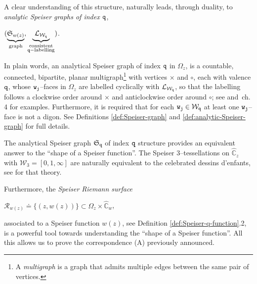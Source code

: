 \documentclass[final,3p,times]{elsarticle}
\newcommand{\CW}{\ensuremath{{\widehat{\mathbb C}}}}
\newcommand{\R}{\ensuremath{{\mathcal R}}}
\theoremstyle{definition}
\begin{document}
\noindent
A clear understanding of this structure, 
naturally leads, through duality, to
\emph{analytic Speiser graphs of index $\tt q$},

\centerline{
$(
\underbrace{\mathfrak{S}_{w(z)} }_{\text{graph}}, 
\underbrace{\  \mathcal{L}_{\mathcal{W}_{\tt q}} \ }_{
\substack{ \text{consistent}\\
{\tt q}-\text{labelling}}
} )$.}

\noindent
In plain words, 
an analytical Speiser graph of index ${\tt q}$
in $\Omega_z$, is a countable, connected, bipartite,
planar multigraph\footnote{
A \emph{multigraph} is a graph that admits multiple edges 
between the same pair of vertices.} 
with vertices $\times$ and $\circ$, each with valence $\tt q$, whose ${\tt w}_{\tt j}$--faces in $\Omega_z$ are
labelled cyclically with $\mathcal{L}_{\mathcal{W}_{\tt q}}$, 
so that the labelling follows a clockwise order around $\times$ and 
anticlockwise order around $\circ$; 
see 
\cite{Nevanlinna2} and 
\cite{GoldbergOstrovskii}\,ch.\,4
for examples.
Furthermore, it is required that for each ${\tt w}_{\tt j}\in\mathcal{W}_{\tt q}$ 
at least one ${\tt w}_{\tt j}$--face is not a digon.
See Definitions \ref{def:Speiser-graph} and \ref{def:analytic-Speiser-graph} for full details.

\noindent
The analytical Speiser graph $\mathfrak{S}_{\tt q}$
of index ${\tt q}$ structure provides
an equivalent answer to the ``shape of a Speiser function''.
The Speiser $3$--tessellations on $\CW_z$
with $\mathcal{W}_3=[0,1,\infty]$ are naturally 
equivalent to the celebrated dessins d'enfants, see
\cite{Jones-Wolfart} for that theory. 

Furthermore, the \emph{Speiser Riemann surface} 

\centerline{$\R_{w(z)} \doteq 
\{(z,w(z))\} \subset\Omega_z\times\CW_w$, }

\noindent 
associated to a Speiser function $w(z)$,
see Definition \ref{def:Speiser-q-function}.2, 
is a powerful tool towards understanding the ``shape of a Speiser function''.  All this allows us to prove
the correspondence (A) previously announced.
\end{document}
